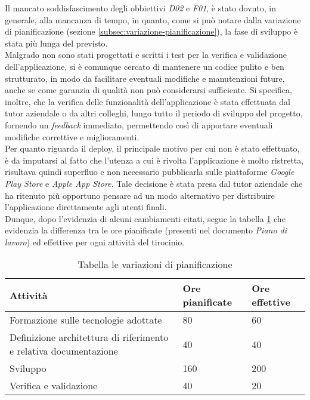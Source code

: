\noindent Il mancato soddisfascimento degli obbiettivi \emph{D02} e \emph{F01}, è stato dovuto, in generale, alla mancanza di tempo, in quanto, come si può notare dalla variazione di pianificazione (sezione \ref{subsec:variazione-pianificazione}), la fase di sviluppo è stata più lunga del previsto.\\
Malgrado non sono stati progettati e scritti i test per la verifica e validazione dell'applicazione, si è comunque cercato di mantenere un codice pulito e ben strutturato, in modo da facilitare eventuali modifiche e manutenzioni future, anche se come garanzia di qualità non può considerarsi sufficiente.
Si specifica, inoltre, che la verifica delle funzionalità dell'applicazione è stata effettuata dal tutor aziendale o da altri colleghi, lungo tutto il periodo di sviluppo del progetto, fornendo un \emph{feedback} immediato, permettendo così di apportare eventuali modifiche correttive e miglioramenti.\\
Per quanto riguarda il \gls{deploy}\glsoccur, il principale motivo per cui non è stato effettuato, è da imputarsi al fatto che l'utenza a cui è rivolta l'applicazione è molto ristretta, risultava quindi superfluo e non necessario pubblicarla sulle piattaforme \emph{Google Play Store} e \emph{Apple App Store}. Tale decisione è stata presa dal tutor aziendale che ha ritenuto più opportuno pensare ad un modo alternativo per distribuire l'applicazione direttamente agli utenti finali.\\
Dunque, dopo l'evidenzia di alcuni cambiamenti citati, segue la tabella \ref{tab:ore-pianificate-effettive} che evidenzia la differenza tra le ore pianificate (presenti nel documento \emph{Piano di lavoro}) ed effettive per ogni attività del tirocinio.

\begin{table}
    \centering
    \begin{tabular}{|l|l|l|}
        \hline
        \textbf{Attività} & \textbf{Ore pianificate} & \textbf{Ore effettive} \\ \hline
        Formazione sulle tecnologie adottate                & 80      & 60    \\ \hline
        Definizione architettura di riferimento e relativa documentazione                & 40      & 40    \\ \hline
        Sviluppo                & 160      & 200    \\ \hline
        Verifica e validazione                & 40      & 20    \\ \hline
    \end{tabular}%
\caption{Tabella le variazioni di pianificazione}
\label{tab:ore-pianificate-effettive}
\end{table}

